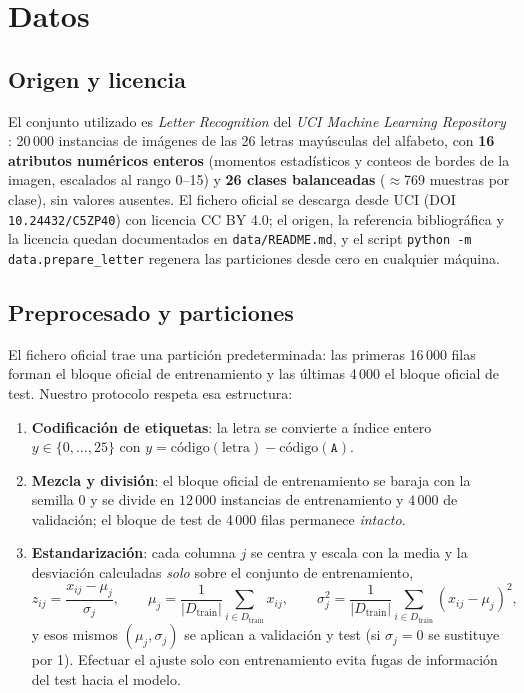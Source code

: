\section{Datos}
\label{sec:datos}

\subsection{Origen y licencia}

El conjunto utilizado es \emph{Letter Recognition} del \emph{UCI Machine Learning Repository} \citep{frey1991}: 20\,000 instancias de imágenes de las 26 letras mayúsculas del alfabeto, con \textbf{16 atributos numéricos enteros} (momentos estadísticos y conteos de bordes de la imagen, escalados al rango 0--15) y \textbf{26 clases balanceadas} ($\approx$769 muestras por clase), sin valores ausentes. El fichero oficial se descarga desde UCI (DOI \texttt{10.24432/C5ZP40}) con licencia CC BY 4.0; el origen, la referencia bibliográfica y la licencia quedan documentados en \texttt{data/README.md}, y el script \texttt{python -m data.prepare\_letter} regenera las particiones desde cero en cualquier máquina.

\subsection{Preprocesado y particiones}

El fichero oficial trae una partición predeterminada: las primeras 16\,000 filas forman el bloque oficial de entrenamiento y las últimas 4\,000 el bloque oficial de test. Nuestro protocolo respeta esa estructura:

\begin{enumerate}
  \item \textbf{Codificación de etiquetas}: la letra se convierte a índice entero $y \in \{0, \dots, 25\}$ con $y = \text{código}(\text{letra}) - \text{código}(\texttt{A})$.
  \item \textbf{Mezcla y división}: el bloque oficial de entrenamiento se baraja con la semilla $0$ y se divide en $12\,000$ instancias de entrenamiento y $4\,000$ de validación; el bloque de test de 4\,000 filas permanece \emph{intacto}.
  \item \textbf{Estandarización}: cada columna $j$ se centra y escala con la media y la desviación calculadas \emph{solo} sobre el conjunto de entrenamiento,
  \begin{equation}
    z_{ij} = \frac{x_{ij} - \mu_j}{\sigma_j},
    \qquad
    \mu_j = \frac{1}{|D_{\text{train}}|} \sum_{i \in D_{\text{train}}} x_{ij},
    \qquad
    \sigma_j^2 = \frac{1}{|D_{\text{train}}|} \sum_{i \in D_{\text{train}}} (x_{ij} - \mu_j)^2,
  \end{equation}
  y esos mismos $(\mu_j, \sigma_j)$ se aplican a validación y test (si $\sigma_j = 0$ se sustituye por 1). Efectuar el ajuste solo con entrenamiento evita fugas de información del test hacia el modelo.
\end{enumerate}


